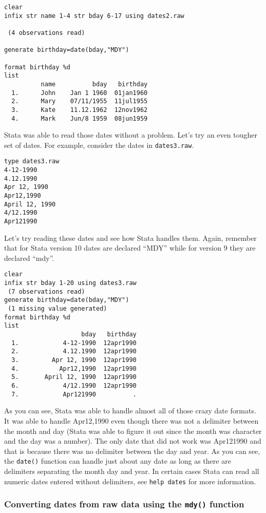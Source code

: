 \begin{lstlisting}
clear
infix str name 1-4 str bday 6-17 using dates2.raw

 (4 observations read)

generate birthday=date(bday,"MDY")

format birthday %d
list
          name          bday   birthday
  1.      John    Jan 1 1960  01jan1960
  2.      Mary    07/11/1955  11jul1955
  3.      Kate    11.12.1962  12nov1962
  4.      Mark    Jun/8 1959  08jun1959
 \end{lstlisting}

Stata was able to read those dates without a problem. Let's try an even tougher set of dates. For example, consider the dates in \lstinline{dates3.raw}.

\begin{lstlisting}
type dates3.raw
4-12-1990
4.12.1990
Apr 12, 1990
Apr12,1990
April 12, 1990
4/12.1990
Apr121990
\end{lstlisting}

Let's try reading these dates and see how Stata handles them. Again, remember that for Stata version 10 dates are declared ``MDY'' while for version 9 they are declared ``mdy''.

\begin{lstlisting}
clear
infix str bday 1-20 using dates3.raw
 (7 observations read)
generate birthday=date(bday,"MDY")
 (1 missing value generated)
format birthday %d
list
                     bday   birthday
  1.            4-12-1990  12apr1990
  2.            4.12.1990  12apr1990
  3.         Apr 12, 1990  12apr1990
  4.           Apr12,1990  12apr1990
  5.       April 12, 1990  12apr1990
  6.            4/12.1990  12apr1990
  7.            Apr121990          .
\end{lstlisting}

As you can see, Stata was able to handle almost all of those crazy date formats. It was able to handle Apr12,1990 even though there was not a delimiter between the month and day (Stata was able to figure it out since the month was character and the day was a number). The only date that did not work was Apr121990 and that is because there was no delimiter between the day and year. As you can see, the \lstinline{date()} function can handle just about any date as long as there are delimiters separating the month day and year. In certain cases Stata can read all numeric dates entered without delimiters, see \lstinline{help dates} for more information.

\subsubsection{Converting dates from raw data using the \lstinline{mdy()} function}

